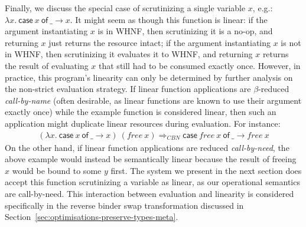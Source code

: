 \documentclass[acmsmall,review,anonymous,screen]{acmart}
\newcommand{\parawith}[1]{\paragraph{\emph{#1}}}
\newcommand{\ccase}[2]{\mathsf{case}~#1~\mathsf{of}~#2}
\begin{document}
Finally, we discuss the special case of scrutinizing a
single variable $x$, e.g.:
$
\lambda x.~\ccase{x}{\_ \to x}
$. 
It might seem as though this function is linear:
if the argument instantiating $x$ is in WHNF, then scrutinizing it is a no-op, and returning $x$
just returns the resource intact;
if the argument instantiating $x$ is not in WHNF, then scrutinizing it evaluates it to WHNF, and returning
$x$ returns the result of evaluating $x$ that still had to be consumed exactly
once.
However, in practice, this program's linearity can only be determined by
further analysis on the non-strict evaluation strategy. If linear
function applications are $\beta$-reduced \emph{call-by-name}
(often desirable, as linear functions are known to use their argument exactly
once)
while the example function is considered linear, then such an application might
duplicate linear resources during evaluation. For instance:
\[
\begin{array}{l}
(\lambda x.~\ccase{x}{\_ \to x})~(free~x)
\Longrightarrow_{CBN}
\ccase{free~x}{\_ \to free~x}
\end{array}
\]
On the other hand, if linear function applications are reduced
\emph{call-by-need}, the above example would instead be semantically linear
because the result of freeing $x$ would be bound to some $y$ first.
%
The system we present in the next section does accept this function
scrutinizing a variable as linear, as our operational semantics are
call-by-need.
This interaction between evaluation and linearity is considered specifically in the
reverse binder swap transformation discussed in
Section~\ref{sec:optimisations-preserve-types-meta}.

\end{document}
